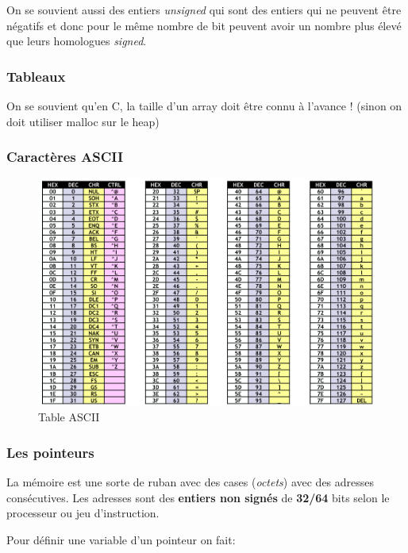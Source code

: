 On se souvient aussi des entiers \emph{unsigned} qui sont des entiers
qui ne peuvent être négatifs et donc pour le même nombre de bit peuvent
avoir un nombre plus élevé que leurs homologues \emph{signed}.

\subsubsection{Tableaux}\label{tableaux}

On se souvient qu'en C, la taille d'un array doit être connu à l'avance
! (sinon on doit utiliser malloc sur le heap)

\subsubsection{Caractères ASCII}\label{caractuxe8res-ascii}

\begin{figure}
\centering
\includegraphics{image-6.png}
\caption{Table ASCII}
\end{figure}

\subsubsection{Les pointeurs}\label{les-pointeurs}

La mémoire est une sorte de ruban avec des cases (\emph{octets}) avec
des adresses consécutives. Les adresses sont des \textbf{entiers non
signés} de \textbf{32/64} bits selon le processeur ou jeu d'instruction.

Pour définir une variable d'un pointeur on fait:

\begin{Shaded}
\begin{Highlighting}[]
\OperatorTok{*}\OperatorTok{;} 
\OperatorTok{\&}\OperatorTok{;} 
\OperatorTok{*}\OperatorTok{;} 
\end{Highlighting}
\end{Shaded}

